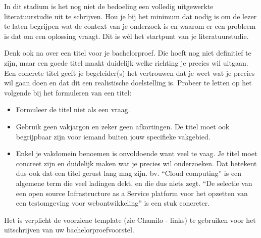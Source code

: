 In dit stadium is het nog niet de bedoeling een volledig uitgewerkte literatuurstudie uit te schrijven. Hou je bij het minimum dat nodig is om de lezer te laten begrijpen wat de context van je onderzoek is en waarom er een probleem is dat om een oplossing vraagt. Dit is wél het startpunt van je literatuurstudie.

Denk ook na over een titel voor je bachelorproef. Die hoeft nog niet definitief te zijn, maar een goede titel maakt duidelijk welke richting je precies wil uitgaan. Een concrete titel geeft je begeleider(s) het vertrouwen dat je weet wat je precies wil gaan doen en dat dit een realistische doelstelling is. Probeer te letten op het volgende bij het formuleren van een titel:

\begin{itemize}
  \item Formuleer de titel niet als een vraag.
  \item Gebruik geen vakjargon en zeker geen afkortingen. De titel moet ook begrijpbaar zijn voor iemand buiten jouw specifieke vakgebied.
  \item Enkel je vakdomein benoemen is onvoldoende want veel te vaag. Je titel moet concreet zijn en duidelijk maken wat je precies wil onderzoeken. Dat betekent dus ook dat een titel gerust lang mag zijn. bv. ``Cloud computing'' is een algemene term die veel ladingen dekt, en die dus niets zegt. ``De selectie van een open source Infrastructure as a Service platform voor het opzetten van een testomgeving voor webontwikkeling'' is een stuk concreter.
\end{itemize}

\begin{framed}
	Het is verplicht de voorziene template (zie Chamilo - links) te gebruiken voor het uitschrijven van uw bachelorproefvoorstel.
\end{framed}



